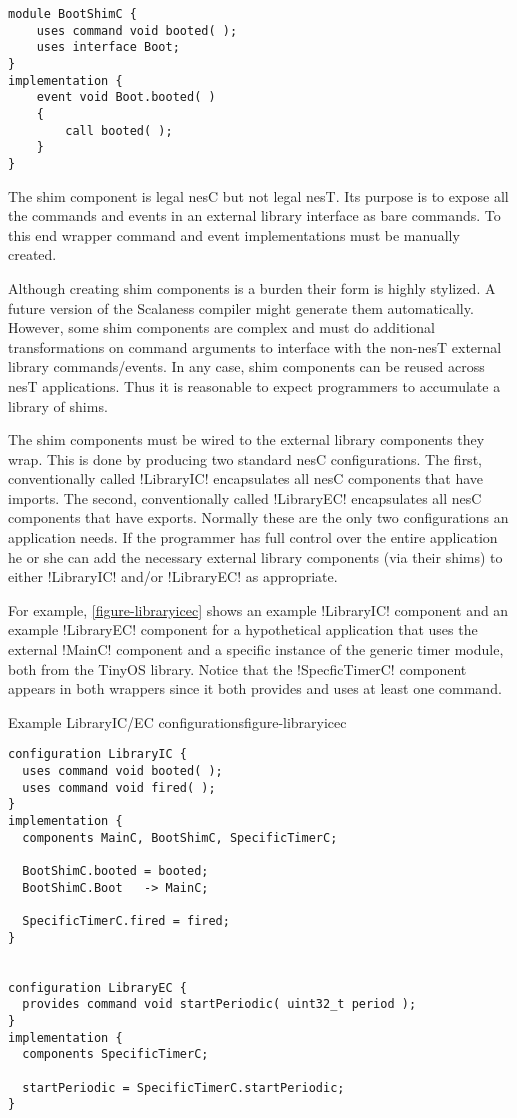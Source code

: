 \singlespace
\vspace{1.0ex}
\begin{lstlisting}[language=nesC]
module BootShimC {
    uses command void booted( );
    uses interface Boot;
}
implementation {
    event void Boot.booted( )
    {
        call booted( );
    }
}
\end{lstlisting}
\vspace{1.0ex}
\primaryspacing

The shim component is legal nesC but not legal nesT. Its purpose is to expose all the commands
and events in an external library interface as bare commands. To this end wrapper command and
event implementations must be manually created.

Although creating shim components is a burden their form is highly stylized. A future version of
the Scalaness compiler might generate them automatically. However, some shim components are
complex and must do additional transformations on command arguments to interface with the
non-nesT external library commands/events. In any case, shim components can be reused across
nesT applications. Thus it is reasonable to expect programmers to accumulate a library of shims.

The shim components must be wired to the external library components they wrap. This is done by
producing two standard nesC configurations. The first, conventionally called !LibraryIC!
encapsulates all nesC components that have imports. The second, conventionally called
!LibraryEC! encapsulates all nesC components that have exports. Normally these are the only two
configurations an application needs. If the programmer has full control over the entire
application he or she can add the necessary external library components (via their shims) to
either !LibraryIC! and/or !LibraryEC! as appropriate.

For example, \autoref{figure-libraryicec} shows an example !LibraryIC! component and an example
!LibraryEC! component for a hypothetical application that uses the external !MainC! component
and a specific instance of the generic timer module, both from the TinyOS library. Notice that
the !SpecficTimerC! component appears in both wrappers since it both provides and uses at least
one command. 

\singlespace
\begin{fpfig}[tbhp]{Example LibraryIC/EC configurations}{figure-libraryicec}
{
\begin{lstlisting}[language=nesC]
configuration LibraryIC {
  uses command void booted( );
  uses command void fired( );
}
implementation {
  components MainC, BootShimC, SpecificTimerC;

  BootShimC.booted = booted;
  BootShimC.Boot   -> MainC;

  SpecificTimerC.fired = fired;
}


configuration LibraryEC {
  provides command void startPeriodic( uint32_t period );
}
implementation {
  components SpecificTimerC;

  startPeriodic = SpecificTimerC.startPeriodic;
}
\end{lstlisting}
}
\end{fpfig}
\primaryspacing

